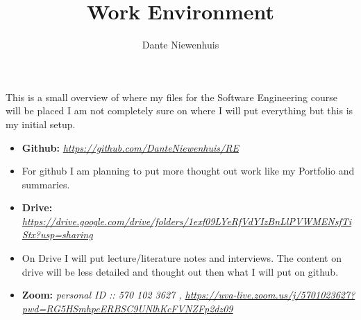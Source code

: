 \documentclass{article}
\title{Work Environment}
\author{Dante Niewenhuis}
\begin{document}
\maketitle

This is a small overview of where my files for the Software Engineering course will be placed 
I am not completely sure on where I will put everything but this is my initial setup.


\begin{itemize}
    \item[] \textbf{Github: } \textit{\url{https://github.com/DanteNiewenhuis/RE}} 
    \item[] For github I am planning to put more thought out work like my Portfolio and summaries.
    \item[] \textbf{Drive: } \textit{\url{https://drive.google.com/drive/folders/1exf09LYeRfVdYIzBnLlPVWMENsfTiStx?usp=sharing}}
    \item[] On Drive I will put lecture/literature notes and interviews. The content on drive will be less detailed and thought out then what I will put on github.  
    \item[] \textbf{Zoom: } \textit{personal ID :: 570 102 3627 , \url{https://uva-live.zoom.us/j/5701023627?pwd=RG5HSmhpeERBSC9UNlhKcFVNZFp2dz09}}
\end{itemize}
\end{document}
